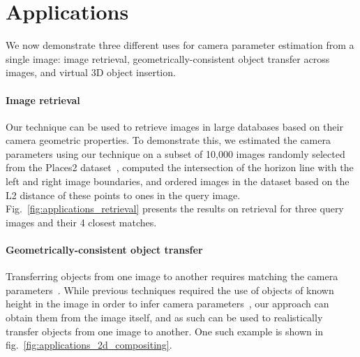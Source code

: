 \section{Applications}

We now demonstrate three different uses for camera parameter estimation from a single image: image retrieval, geometrically-consistent object transfer across images, and virtual 3D object insertion.

\paragraph{Image retrieval}

Our technique can be used to retrieve images in large databases based on their camera geometric properties. To demonstrate this, we estimated the camera parameters using our technique on a subset of 10,000 images randomly selected from the Places2 dataset~\cite{Zhou2017}, computed the intersection of the horizon line with the left and right image boundaries, and ordered images in the dataset based on the L2 distance of these points to ones in the query image. Fig.~\ref{fig:applications_retrieval} presents the results on retrieval for three query images and their 4 closest matches.

\paragraph{Geometrically-consistent object transfer}

Transferring objects from one image to another requires matching the camera parameters~\cite{lalonde-siggraph-07}. While previous techniques required the use of objects of known height in the image in order to infer camera parameters~\cite{lalonde-siggraph-07}, our approach can obtain them from the image itself, and as such can be used to realistically transfer objects from one image to another. One such example is shown in fig.~\ref{fig:applications_2d_compositing}. 

